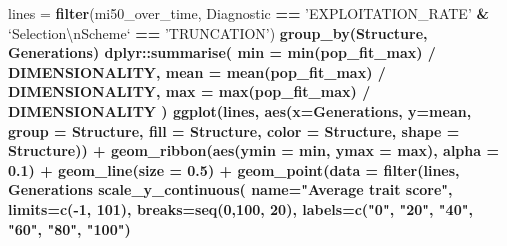 \documentclass[]{book}
\newenvironment{Shaded}{\begin{snugshade}}{\end{snugshade}}
\newcommand{\CharTok}[1]{\textcolor[rgb]{0.31,0.60,0.02}{#1}}
\newcommand{\DataTypeTok}[1]{\textcolor[rgb]{0.13,0.29,0.53}{#1}}
\newcommand{\DecValTok}[1]{\textcolor[rgb]{0.00,0.00,0.81}{#1}}
\newcommand{\FloatTok}[1]{\textcolor[rgb]{0.00,0.00,0.81}{#1}}
\newcommand{\KeywordTok}[1]{\textcolor[rgb]{0.13,0.29,0.53}{\textbf{#1}}}
\newcommand{\NormalTok}[1]{#1}
\newcommand{\OperatorTok}[1]{\textcolor[rgb]{0.81,0.36,0.00}{\textbf{#1}}}
\newcommand{\StringTok}[1]{\textcolor[rgb]{0.31,0.60,0.02}{#1}}
\begin{document}
\begin{Shaded}
\begin{Highlighting}[]
\NormalTok{lines =}\StringTok{ }\KeywordTok{filter}\NormalTok{(mi50_over_time, Diagnostic }\OperatorTok{==}\StringTok{ 'EXPLOITATION_RATE'} \OperatorTok{&}\StringTok{ `}\DataTypeTok{Selection}\CharTok{\textbackslash{}n}\DataTypeTok{Scheme}\StringTok{`} \OperatorTok{==}\StringTok{ 'TRUNCATION'}\NormalTok{) }\OperatorTok{%>%}
\StringTok{  }\KeywordTok{group_by}\NormalTok{(Structure, Generations) }\OperatorTok{%>%}
\StringTok{  }\NormalTok{dplyr}\OperatorTok{::}\KeywordTok{summarise}\NormalTok{(}
    \DataTypeTok{min =} \KeywordTok{min}\NormalTok{(pop_fit_max) }\OperatorTok{/}\StringTok{ }\NormalTok{DIMENSIONALITY,}
    \DataTypeTok{mean =} \KeywordTok{mean}\NormalTok{(pop_fit_max) }\OperatorTok{/}\StringTok{ }\NormalTok{DIMENSIONALITY,}
    \DataTypeTok{max =} \KeywordTok{max}\NormalTok{(pop_fit_max) }\OperatorTok{/}\StringTok{ }\NormalTok{DIMENSIONALITY}
\NormalTok{  )}
\KeywordTok{ggplot}\NormalTok{(lines, }\KeywordTok{aes}\NormalTok{(}\DataTypeTok{x=}\NormalTok{Generations, }\DataTypeTok{y=}\NormalTok{mean, }\DataTypeTok{group =}\NormalTok{ Structure, }\DataTypeTok{fill =}\NormalTok{ Structure, }\DataTypeTok{color =}\NormalTok{ Structure, }\DataTypeTok{shape =}\NormalTok{ Structure)) }\OperatorTok{+}
\StringTok{  }\KeywordTok{geom_ribbon}\NormalTok{(}\KeywordTok{aes}\NormalTok{(}\DataTypeTok{ymin =}\NormalTok{ min, }\DataTypeTok{ymax =}\NormalTok{ max), }\DataTypeTok{alpha =} \FloatTok{0.1}\NormalTok{) }\OperatorTok{+}
\StringTok{  }\KeywordTok{geom_line}\NormalTok{(}\DataTypeTok{size =} \FloatTok{0.5}\NormalTok{) }\OperatorTok{+}
\StringTok{  }\KeywordTok{geom_point}\NormalTok{(}\DataTypeTok{data =} \KeywordTok{filter}\NormalTok{(lines, Generations }\OperatorTok{%%}\StringTok{ }\DecValTok{2000} \OperatorTok{==}\StringTok{ }\DecValTok{0}\NormalTok{), }\DataTypeTok{size =} \FloatTok{2.5}\NormalTok{, }\DataTypeTok{stroke =} \FloatTok{2.0}\NormalTok{, }\DataTypeTok{alpha =} \FloatTok{1.0}\NormalTok{) }\OperatorTok{+}
\StringTok{  }\KeywordTok{scale_y_continuous}\NormalTok{(}
    \DataTypeTok{name=}\StringTok{"Average trait score"}\NormalTok{,}
    \DataTypeTok{limits=}\KeywordTok{c}\NormalTok{(}\OperatorTok{-}\DecValTok{1}\NormalTok{, }\DecValTok{101}\NormalTok{),}
    \DataTypeTok{breaks=}\KeywordTok{seq}\NormalTok{(}\DecValTok{0}\NormalTok{,}\DecValTok{100}\NormalTok{, }\DecValTok{20}\NormalTok{),}
    \DataTypeTok{labels=}\KeywordTok{c}\NormalTok{(}\StringTok{"0"}\NormalTok{, }\StringTok{"20"}\NormalTok{, }\StringTok{"40"}\NormalTok{, }\StringTok{"60"}\NormalTok{, }\StringTok{"80"}\NormalTok{, }\StringTok{"100"}\NormalTok{)}
}}}
\end{Highlighting}
\end{Shaded}
\end{document}
